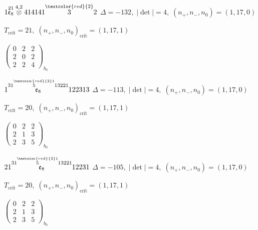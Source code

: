 \documentclass[10pt]{article}
\begin{document}
\smallskip

$1\overset{21}{\mathfrak{e}_8}\overset{4,2}{\otimes}414141\overset{\textcolor{red}{2}}{3}2$ \quad $\Delta=-132,\; |\det|=4,\; (n_+,n_-,n_0)=(1,17,0)$

\hspace{1em}$T_{\text{crit}}=21,\; (n_+,n_-,n_0)_{\text{crit}}=(1,17,1)$

\hspace{2em}$\left(\begin{smallmatrix}0 & 2 & 2 \\ 2 & 0 & 2 \\ 2 & 2 & 4\end{smallmatrix}\right)_{\!b_0}$

\smallskip

$1\overset{31\overset{\textcolor{red}{2}1}{5}13221}{\mathfrak{e}_8}122313$ \quad $\Delta=-113,\; |\det|=4,\; (n_+,n_-,n_0)=(1,17,0)$

\hspace{1em}$T_{\text{crit}}=20,\; (n_+,n_-,n_0)_{\text{crit}}=(1,17,1)$

\hspace{2em}$\left(\begin{smallmatrix}0 & 2 & 2 \\ 2 & 1 & 3 \\ 2 & 3 & 5\end{smallmatrix}\right)_{\!b_0}$

\smallskip

$21\overset{31\overset{\textcolor{red}{2}1}{5}13221}{\mathfrak{e}_8}12231$ \quad $\Delta=-105,\; |\det|=4,\; (n_+,n_-,n_0)=(1,17,0)$

\hspace{1em}$T_{\text{crit}}=20,\; (n_+,n_-,n_0)_{\text{crit}}=(1,17,1)$

\hspace{2em}$\left(\begin{smallmatrix}0 & 2 & 2 \\ 2 & 1 & 3 \\ 2 & 3 & 5\end{smallmatrix}\right)_{\!b_0}$

\smallskip
\end{document}
